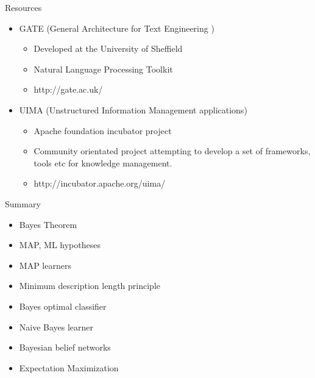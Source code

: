 \documentclass[%
pdf,
colorBG,
slideColor,
tcrico,
]{prosper}
\begin{document}

\begin{slide}{Resources}
	\begin{itemize}
	\item GATE (General Architecture for Text Engineering )
		\begin{itemize}
		\item Developed at the University of Sheffield
		\item Natural Language Processing Toolkit
		\item http://gate.ac.uk/
		\end{itemize}
	\item UIMA (Unstructured Information Management applications)
		\begin{itemize}
		\item Apache foundation incubator project
		\item Community orientated project attempting to develop a set of frameworks, tools etc for knowledge management. 
		\item http://incubator.apache.org/uima/
		\end{itemize}
	\end{itemize}
\end{slide}




\begin{slide}{Summary}
	\begin{itemize}
	\item Bayes Theorem
	\item MAP, ML hypotheses
	\item MAP learners
	\item Minimum description length principle
	\item Bayes optimal classifier
	\item Naive Bayes learner
	\item Bayesian belief networks
	\item Expectation Maximization 
	\end{itemize}
\end{slide}
\end{document}
